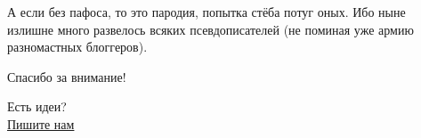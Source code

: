 \documentclass{ideas}
\begin{document}
 А если без пафоса, то это пародия, попытка стёба потуг оных. Ибо ныне излишне много развелось всяких псевдописателей (не поминая уже армию разномастных блоггеров).





\begin{center}
    Спасибо за внимание!
\end{center}


\begin{center}
{\large Есть идеи?\\
\href{mailto:anto-kha0@rambler.ru}%
{Пишите нам}}
\end{center}
\end{document}
